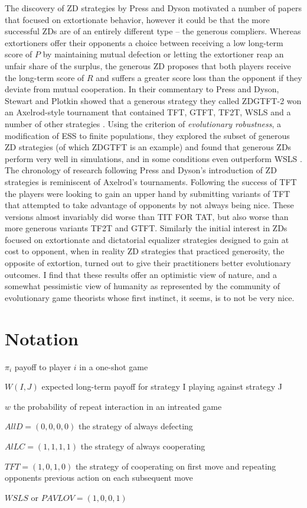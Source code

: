 The discovery of ZD strategies by Press and Dyson motivated a number of papers that focused on extortionate behavior, however it could be that the more successful ZDs are of an entirely different type -- the generous compliers. Whereas extortioners offer their opponents a choice between receiving a low long-term score of $P$ by maintaining mutual defection or letting the extortioner reap an unfair share of the surplus, the generous ZD proposes that both players receive the long-term score of $R$ and suffers a greater score loss than the opponent if they deviate from mutual cooperation. In their commentary to Press and Dyson, Stewart and Plotkin showed that a generous strategy they called ZDGTFT-2 won an Axelrod-style tournament that contained TFT, GTFT, TF2T, WSLS and a number of other strategies \cite{Stewart26062012}. Using the criterion of \textit{evolutionary robustness}, a modification of ESS to finite populations, they explored the subset of generous ZD strategies (of which ZDGTFT is an example) and found that generous ZDs perform very well in simulations, and in some conditions even outperform WSLS \cite{Stewart03092013}. The chronology of research following Press and Dyson's introduction of ZD strategies is reminiscent of Axelrod's tournaments. Following the success of TFT the players were looking to gain an upper hand by submitting variants of TFT that attempted to take advantage of opponents by not always being nice. These versions almost invariably did worse than TIT FOR TAT, but also worse than more generous variants TF2T and GTFT. Similarly the initial interest in ZDs focused on extortionate and dictatorial equalizer strategies designed to gain at cost to opponent, when in reality ZD strategies that practiced generosity, the opposite of extortion, turned out to give their practitioners better evolutionary outcomes. I find that these results offer an optimistic view of nature, and a somewhat pessimistic view of humanity as represented by the community of evolutionary game theorists whose first instinct, it seems, is to not be very nice.


\section{Notation}
$\pi_i$ payoff to player $i$ in a one-shot game

$W(I, J)$ expected long-term payoff for strategy I playing against strategy J

$w$ the probability of repeat interaction in an intreated game

$AllD = (0, 0, 0, 0)$ the strategy of always defecting

$AlLC = (1, 1, 1, 1)$ the strategy of always cooperating

$TFT = (1, 0, 1, 0)$ the strategy of cooperating on first move and repeating opponents previous action on each subsequent move

$WSLS$ or $PAVLOV = (1,0,0,1)$
